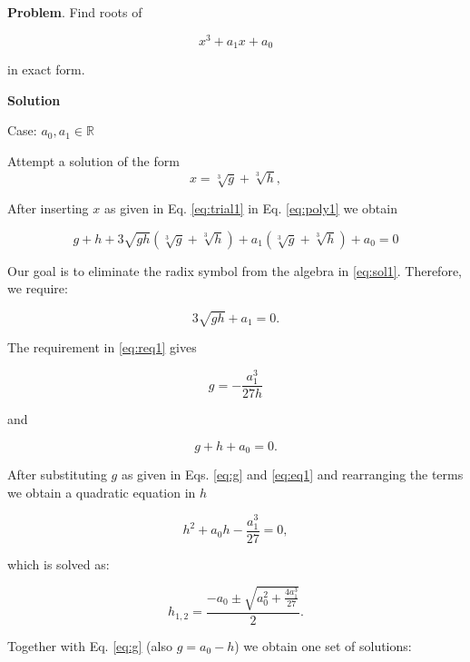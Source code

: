 \documentclass{article}
\begin{document}
{\bf Problem}. Find roots of

\begin{equation}
  x^3+a_1x+a_0
  \label{eq:poly1}
\end{equation}

in exact form.

{\bf Solution} 

Case: $a_0, a_1 \in\mathbb{R}$

Attempt a solution of the form
\begin{equation}
  x=\sqrt[3]{g}+\sqrt[3]{h},
  \label{eq:trial1}
\end{equation}


After inserting $x$ as given in Eq. \eqref{eq:trial1} in Eq. \eqref{eq:poly1} we obtain

\begin{equation}
  g+h+3\sqrt{gh}\left(\sqrt[3]{g}+\sqrt[3]{h}\right)+a_1\left(\sqrt[3]{g}+\sqrt[3]{h}\right)+a_0=0
  \label{eq:sol1}
\end{equation}

Our goal is to eliminate the radix symbol from the algebra in \eqref{eq:sol1}. Therefore, we require:

\begin{equation}
  3\sqrt{gh}+a_1=0.
  \label{eq:req1}
\end{equation}

The requirement in \eqref{eq:req1} gives

\begin{equation}
  g=-\frac{a_1^3}{27h}
  \label{eq:g}
\end{equation}

and

\begin{equation}
  g+h+a_0=0.
  \label{eq:eq1}
\end{equation}

After substituting $g$ as given in Eqs. \eqref{eq:g} and \eqref{eq:eq1} and rearranging the terms we obtain a quadratic equation in $h$

\begin{equation}
  h^2+a_0h-\frac{a_1^3}{27}=0,
  \label{eq:eqh} 
\end{equation}

which is solved as:

\begin{equation}
  h_{1,2}=\frac{-a_0\pm\sqrt{a_0^2+\frac{4a_1^3}{27}}}{2}.
  \label{eq:solh}
\end{equation}

Together with Eq. \eqref{eq:g} (also $g=a_0-h$) we obtain one set of solutions:
\end{document}
